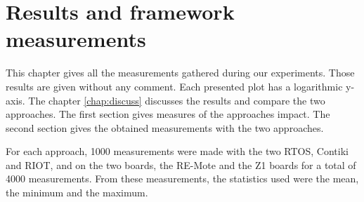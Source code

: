 \chapter{Results and framework measurements \label{chap:results}}

This chapter gives all the measurements gathered during our experiments.
Those results are given without any comment.
Each presented plot has a logarithmic y-axis.
The chapter \ref{chap:discuss} discusses the results and compare the two approaches.
The first section gives measures of the approaches impact.
The second section gives the obtained measurements with the two approaches.

For each approach, 1000 measurements were made with the two RTOS, Contiki and RIOT, and on the two boards, the RE-Mote and the Z1 boards for a total of 4000 measurements. 
From these measurements, the statistics used were the mean, the minimum and the maximum.



